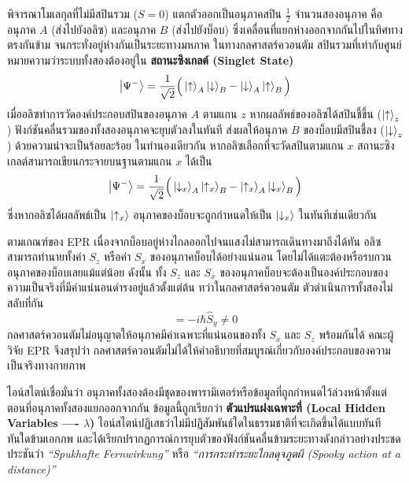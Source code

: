 พิจารณาโมเลกุลที่ไม่มีสปินรวม ($S=0$) แตกตัวออกเป็นอนุภาคสปิน $\frac{1}{2}$ จำนวนสองอนุภาค คืออนุภาค $A$ (ส่งไปยังอลิซ) และอนุภาค $B$ (ส่งไปยังบ็อบ) ซึ่งเคลื่อนที่แยกห่างออกจากกันไปในทิศทางตรงกันข้าม จนกระทั่งอยู่ห่างกันเป็นระยะทางมหภาค ในทางกลศาสตร์ควอนตัม สปินรวมที่เท่ากับศูนย์หมายความว่าระบบทั้งสองต้องอยู่ใน \textbf{สถานะซิงเกลต์ (Singlet State)}
\begin{equation}
\ket{\Psi^-} = \frac{1}{\sqrt{2}} \Big( \ket{\uparrow}_A \ket{\downarrow}_B - \ket{\downarrow}_A \ket{\uparrow}_B \Big)
\label{eq:epr_singlet}
\end{equation}
เมื่ออลิซทำการวัดองค์ประกอบสปินของอนุภาค $A$ ตามแกน $z$ หากผลลัพธ์ของอลิซได้สปินชี้ขึ้น ($\ket{\uparrow}_z$) ฟังก์ชันคลื่นรวมของทั้งสองอนุภาคจะยุบตัวลงในทันที ส่งผลให้อนุภาค $B$ ของบ็อบมีสปินชี้ลง ($\ket{\downarrow}_z$) ด้วยความน่าจะเป็นร้อยละร้อย ในทำนองเดียวกัน หากอลิซเลือกที่จะวัดสปินตามแกน $x$ สถานะซิงเกลต์สามารถเขียนกระจายบนฐานตามแกน $x$ ได้เป็น
\begin{equation}
\ket{\Psi^-} = \frac{1}{\sqrt{2}} \Big( \ket{\downarrow_x}_A \ket{\uparrow_x}_B - \ket{\uparrow_x}_A \ket{\downarrow_x}_B \Big)
\end{equation}
ซึ่งหากอลิซได้ผลลัพธ์เป็น $\ket{\uparrow_x}$ อนุภาคของบ็อบจะถูกกำหนดให้เป็น $\ket{\downarrow_x}$ ในทันทีเช่นเดียวกัน

ตามเกณฑ์ของ EPR เนื่องจากบ็อบอยู่ห่างไกลออกไปจนแสงไม่สามารถเดินทางมาถึงได้ทัน อลิซสามารถทำนายทั้งค่า $S_z$ หรือค่า $S_x$ ของอนุภาคบ็อบได้อย่างแน่นอน โดยไม่ได้แตะต้องหรือรบกวนอนุภาคของบ็อบเลยแม้แต่น้อย ดังนั้น ทั้ง $S_z$ และ $S_x$ ของอนุภาคบ็อบจะต้องเป็นองค์ประกอบของความเป็นจริงที่มีค่าแน่นอนดำรงอยู่แล้วตั้งแต่ต้น ทว่าในกลศาสตร์ควอนตัม ตัวดำเนินการทั้งสองไม่สลับที่กัน
\begin{equation}
[\hat{S}_x, \hat{S}_z] = -i\hbar \hat{S}_y \ne 0
\end{equation}
กลศาสตร์ควอนตัมไม่อนุญาตให้อนุภาคมีค่าเฉพาะที่แน่นอนของทั้ง $S_x$ และ $S_z$ พร้อมกันได้ คณะผู้วิจัย EPR จึงสรุปว่า กลศาสตร์ควอนตัมไม่ได้ให้คำอธิบายที่สมบูรณ์เกี่ยวกับองค์ประกอบของความเป็นจริงทางกายภาพ

ไอน์สไตน์เชื่อมั่นว่า อนุภาคทั้งสองต้องมีชุดของพารามิเตอร์หรือข้อมูลที่ถูกกำหนดไว้ล่วงหน้าตั้งแต่ตอนที่อนุภาคทั้งสองแยกออกจากกัน ข้อมูลนี้ถูกเรียกว่า \textbf{ตัวแปรแฝงเฉพาะที่ (Local Hidden Variables ---- $\lambda$)} ไอน์สไตน์ปฏิเสธว่าไม่มีปฏิสัมพันธ์ใดในธรรมชาติที่จะเกิดขึ้นได้แบบทันทีทันใดข้ามเอกภพ และได้เรียกปรากฏการณ์การยุบตัวของฟังก์ชันคลื่นข้ามระยะทางดังกล่าวอย่างประชดประชันว่า \textit{“Spukhafte Fernwirkung”} หรือ \textit{“การกระทำระยะไกลดุจภูตผี (Spooky action at a distance)”}

